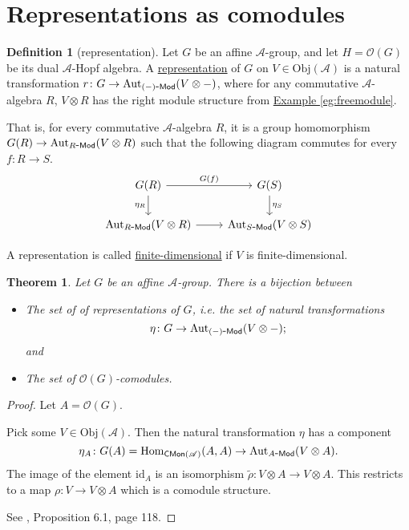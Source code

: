 \documentclass[a4paper,10pt]{scrreprt}
\newcommand{\defn}[1]{\ul{#1}}
\newcommand{\Obj}{\mathrm{Obj}}
\newcommand{\Hom}{\mathrm{Hom}}
\newcommand{\Aut}{\mathrm{Aut}}
\def\mhyp{{\hbox{-}}}
\theoremstyle{definition}
\newtheorem{definition}{Definition}[section]
\theoremstyle{plain}
\newtheorem{theorem}{Theorem}[section]
\theoremstyle{remark}
\begin{document}
\section{Representations as comodules} \label{sec:representationsascomodules}
\begin{definition}[representation]
  \label{def:representationofgroup}
  Let $G$ be an affine $\mathscr{A}$-group, and let $H = \mathscr{O}(G)$ be its dual $\mathscr{A}$-Hopf algebra. A \defn{representation} of $G$ on $V \in \Obj(\mathscr{A})$ is a natural transformation $r\colon G \to \mathrm{Aut}_{(-)\mhyp\mathsf{Mod}}(V \otimes -)$, where for any commutative $\mathscr{A}$-algebra $R$, $V \otimes R$ has the right module structure from \hyperref[eg:freemodule]{Example \ref*{eg:freemodule}}.

  That is, for every commutative $\mathscr{A}$-algebra $R$, it is a group homomorphism $G(R) \to \mathrm{Aut}_{R\mhyp\mathsf{Mod}}(V \otimes R)$ such that the following diagram commutes for every $f\colon R \to S$.
  \begin{equation*}
    \begin{tikzcd}
      G(R)
      \arrow[r, "G(f)"]
      \arrow[d, swap, "\eta_{R}"]
      & G(S)
      \arrow[d, "\eta_{S}"]
      \\
      \mathrm{Aut}_{R\mhyp\mathsf{Mod}}(V \otimes R)
      \arrow[r, swap]
      & \mathrm{Aut}_{S\mhyp\mathsf{Mod}}(V \otimes S)
    \end{tikzcd}
  \end{equation*}

  A representation is called \defn{finite-dimensional} if $V$ is finite-dimensional.
\end{definition}

\begin{theorem}
  Let $G$ be an affine $\mathscr{A}$-group. There is a bijection between
  \begin{itemize}
    \item The set of of representations of $G$, i.e. the set of natural transformations
      \begin{equation*}
        \eta\colon G \to \mathrm{Aut}_{(-)\mhyp\mathsf{Mod}}(V \otimes -);
      \end{equation*}
      and

    \item The set of $\mathscr{O}(G)$-comodules.
  \end{itemize}
\end{theorem}
\begin{proof}
  Let $A = \mathscr{O}(G)$.

  Pick some $V \in \Obj(\mathscr{A})$. Then the natural transformation $\eta$ has a component 
  \begin{equation*}
    \eta_{A}\colon G(A) = \Hom_{\mathsf{CMon}(\mathscr{A})}(A, A) \to \Aut_{A\mhyp \mathsf{Mod}}(V \otimes A). 
  \end{equation*}
  The image of the element $\mathrm{id}_{A}$ is an isomorphism $\tilde{\rho}\colon V \otimes A \to V \otimes A$. This restricts to a map $\rho\colon V \to V \otimes A$ which is a comodule structure.

  See \cite{milne-affine-group-schemes}, Proposition 6.1, page 118.
\end{proof}
\end{document}
